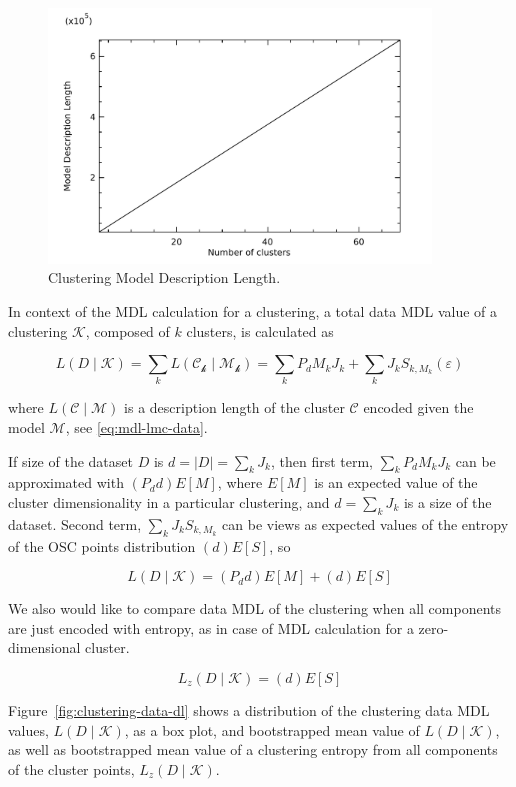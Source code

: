 \begin{figure}[H]
\center
\includegraphics[width=4.0in]{img/mdl-clust_clustering-model-dl_1.pdf}
\caption{Clustering Model Description Length.}
\label{fig:clustering-model-dl}
\end{figure}



In context of the MDL calculation for a clustering, a total data MDL value of
a clustering $\mathcal{K}$, composed of $k$ clusters, is calculated as

\begin{equation}
L(D \;|\;\mathcal{K}) = \sum_k L(\mathcal{C_k} \;|\;\mathcal{M_k}) = \sum_k P_d M_k J_k + \sum_k J_k S_{k, M_k}(\varepsilon)
\end{equation}

where $L(\mathcal{C} \;|\;\mathcal{M})$ is a description length of the cluster
$\mathcal{C}$ encoded given the model $\mathcal{M}$, see \eqref{eq:mdl-lmc-data}.




If size of the dataset $D$ is $d = |D| = \sum_k J_k$, then first term,
$\sum_k P_d M_k J_k$ can be approximated with $(P_d d) E[M]$,
where $E[M]$ is an expected value of the cluster dimensionality in a particular
clustering, and $d = \sum_k J_k$ is a size of the dataset.
Second term, $\sum_k J_k S_{k, M_k}$ can be views as expected values of
the entropy of the OSC points distribution $(d)E[S]$, so

$$L(D \;|\;\mathcal{K}) = (P_d d) E[M] + (d) E[S]$$

We also would like to compare data MDL of the clustering when all components are
just encoded with entropy, as in case of MDL calculation for a zero-dimensional
cluster.

$$L_z(D \;|\;\mathcal{K}) = (d)E[S]$$

Figure~\ref{fig:clustering-data-dl} shows a distribution of the clustering data
MDL values, $L(D \;|\;\mathcal{K})$, as a box plot, and bootstrapped mean value
of $L(D \;|\;\mathcal{K})$, as well as bootstrapped mean value of a clustering
entropy from all components of the cluster points, $L_z(D \;|\;\mathcal{K})$.

